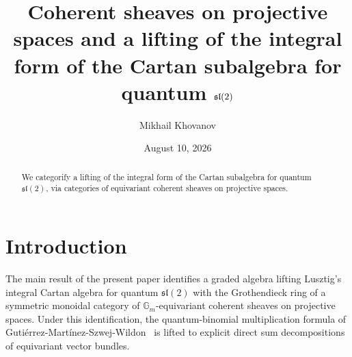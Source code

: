 \documentclass{article}
\title{Coherent sheaves on projective spaces and a lifting of the integral form of the Cartan subalgebra for quantum $\mathfrak{sl}(2)$}
\author{Mikhail Khovanov}
\date{August 10, 2026}
\theoremstyle{definition}
\theoremstyle{definition}
\begin{document}
\maketitle

\begin{abstract}
We categorify a lifting of the integral form of the Cartan subalgebra for quantum $\mathfrak{sl}(2)$, via categories of equivariant coherent sheaves on projective spaces.
\end{abstract}

\tableofcontents

\section{Introduction}

The main result of the present paper identifies a graded algebra lifting Lusztig's integral Cartan algebra for quantum $\mathfrak{sl}(2)$ with the Grothendieck ring of a symmetric monoidal category of $\mathbb{G}_m$-equivariant coherent sheaves on projective spaces. Under this identification, the quantum-binomial multiplication formula of Guti\'errez-Mart\'inez-Szwej-Wildon~\cite{GMSW1} is lifted to  explicit direct sum decompositions of equivariant vector bundles.

\vspace{0.07in}
\end{document}
